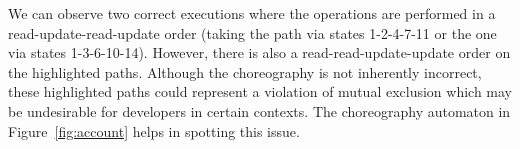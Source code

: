 We can observe two correct executions where the operations are
performed in a read-update-read-update order (taking the path via
states 1-2-4-7-11 or the one via states 1-3-6-10-14).
%
However, there is also a read-read-update-update order on the
highlighted paths.
%
Although the choreography is not inherently incorrect, these
highlighted paths could represent a violation of mutual exclusion
which may be undesirable for developers in certain
contexts.
The choreography automaton in Figure~\ref{fig:account} helps in spotting
this issue.


